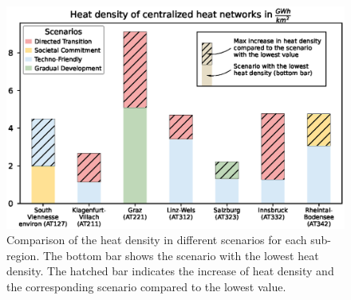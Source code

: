 \begin{figure}[h]
	\centering
	\includegraphics[width=1\linewidth]{figures/4_Results/Fig_benchmark/benchmark.eps}
	\caption{Comparison of the heat density in different scenarios for each sub-region. The bottom bar shows the scenario with the lowest heat density. The hatched bar indicates the increase of heat density and the corresponding scenario compared to the lowest value.}
	\label{fig:res4}
\end{figure}
